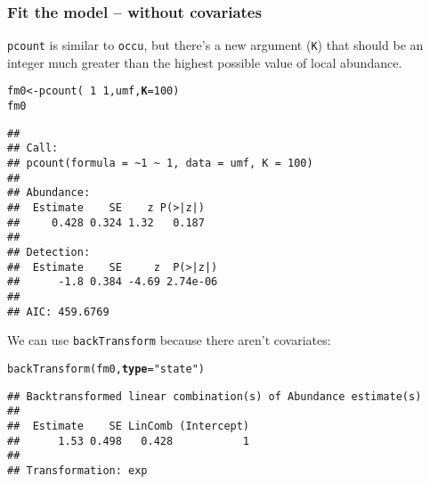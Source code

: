\documentclass[color=usenames,dvipsnames]{beamer}\usepackage[]{graphicx}\usepackage[]{color}
\makeatletter
\newcommand{\hlnum}[1]{\textcolor[rgb]{0.69,0.494,0}{#1}}%
\newcommand{\hlstr}[1]{\textcolor[rgb]{0.749,0.012,0.012}{#1}}%
\newcommand{\hlopt}[1]{\textcolor[rgb]{0,0,0}{#1}}%
\newcommand{\hlstd}[1]{\textcolor[rgb]{0,0,0}{#1}}%
\newcommand{\hlkwb}[1]{\textcolor[rgb]{0,0.341,0.682}{#1}}%
\newcommand{\hlkwc}[1]{\textcolor[rgb]{0,0,0}{\textbf{#1}}}%
\newcommand{\hlkwd}[1]{\textcolor[rgb]{0.004,0.004,0.506}{#1}}%
\newenvironment{kframe}{%
 \def\at@end@of@kframe{}%
 \ifinner\ifhmode%
  \def\at@end@of@kframe{\end{minipage}}%
  \begin{minipage}{\columnwidth}%
 \fi\fi%
 \def\FrameCommand##1{\hskip\@totalleftmargin \hskip-\fboxsep
 \colorbox{shadecolor}{##1}\hskip-\fboxsep
     \hskip-\linewidth \hskip-\@totalleftmargin \hskip\columnwidth}%
 \MakeFramed {\advance\hsize-\width
   \@totalleftmargin\z@ \linewidth\hsize
   \@setminipage}}%
 {\par\unskip\endMakeFramed%
 \at@end@of@kframe}
\newenvironment{knitrout}{}{} %
\newcommand{\inr}[1]{\colorbox{inlinecolor}{\texttt{#1}}}
\makeatother
\begin{document}
\begin{frame}[fragile]
  \frametitle{Fit the model -- without covariates}
  \footnotesize
  \inr{pcount} is similar to \inr{occu}, but there's a new argument
  (\texttt{K}) that should be an integer much 
  greater than the highest possible value of local abundance. 
\begin{knitrout}\tiny
{}\color{fgcolor}\begin{kframe}
\begin{alltt}
\hlstd{fm0} \hlkwb{<-} \hlkwd{pcount}\hlstd{(}\hlopt{~}\hlnum{1} \hlopt{~}\hlnum{1}\hlstd{, umf,} \hlkwc{K}\hlstd{=}\hlnum{100}\hlstd{)}
\hlstd{fm0}
\end{alltt}
\begin{verbatim}
## 
## Call:
## pcount(formula = ~1 ~ 1, data = umf, K = 100)
## 
## Abundance:
##  Estimate    SE    z P(>|z|)
##     0.428 0.324 1.32   0.187
## 
## Detection:
##  Estimate    SE     z  P(>|z|)
##      -1.8 0.384 -4.69 2.74e-06
## 
## AIC: 459.6769
\end{verbatim}
\end{kframe}
\end{knitrout}
\pause
\vfill
We can use \inr{backTransform} because there aren't covariates:
\begin{knitrout}\tiny
{}\color{fgcolor}\begin{kframe}
\begin{alltt}
\hlkwd{backTransform}\hlstd{(fm0,} \hlkwc{type}\hlstd{=}\hlstr{"state"}\hlstd{)}
\end{alltt}
\begin{verbatim}
## Backtransformed linear combination(s) of Abundance estimate(s)
## 
##  Estimate    SE LinComb (Intercept)
##      1.53 0.498   0.428           1
## 
## Transformation: exp
\end{verbatim}
\end{kframe}
\end{knitrout}
\end{frame}
\end{document}
